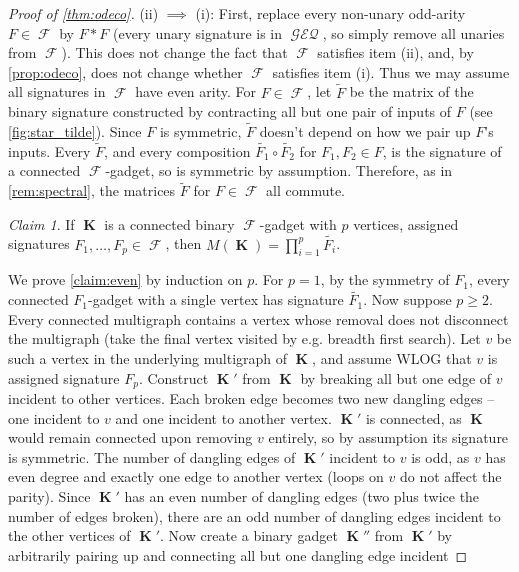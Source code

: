 \documentclass{article}
\theoremstyle{remark}
\newtheorem{claim}{Claim}[section]
\theoremstyle{definition}
\DeclareMathOperator{\vk}{\mathbf{K}}
\DeclareMathOperator{\fc}{\mathcal{F}}
\DeclareMathOperator{\geneq}{\mathcal{GEQ}}
\begin{document}
\begin{proof}[Proof of \autoref{thm:odeco}]
    (ii) $\implies$ (i): First, replace every non-unary odd-arity $F \in \fc$ by $F * F$
    (every unary signature is in $\geneq$, so simply remove all unaries from $\fc$). 
    This does not change
    the fact that $\fc$ satisfies item (ii), and, by \autoref{prop:odeco}, does not change whether
    $\fc$ satisfies item (i). Thus we may assume all signatures in $\fc$ have even arity. 
    For $F \in \fc$, let $\widetilde{F}$ be the 
    matrix of the binary signature constructed by contracting all but one pair of inputs of $F$ (see
    \autoref{fig:star_tilde}).
    Since $F$ is symmetric, $\widetilde{F}$ doesn't depend on how we pair up $F$'s inputs. 
    Every $\widetilde{F}$, and every composition $\widetilde{F_1} \circ \widetilde{F_2}$ for
    $F_1,F_2 \in F$, is the signature of a connected $\fc$-gadget, so is symmetric by assumption. 
    Therefore, as in \autoref{rem:spectral}, the matrices $\widetilde{F}$ for $F \in \fc$ all commute.
    \begin{claim}
        \label{claim:even}
        If $\vk$ is a connected binary $\fc$-gadget with $p$ vertices, assigned signatures 
        $F_1,\ldots,F_p \in \fc$, then $M(\vk) = \prod_{i=1}^p \widetilde{F_i}$.
    \end{claim}
    We prove \autoref{claim:even} by induction on $p$. For $p=1$, by the symmetry of $F_1$,
    every connected $F_1$-gadget with a single vertex has signature $\widetilde{F_1}$. 
    Now suppose $p \geq 2$. Every connected multigraph contains a vertex whose removal does not disconnect
    the multigraph (take the final vertex visited by e.g. breadth first search). Let $v$ be such
    a vertex in the underlying multigraph of $\vk$, and assume WLOG that $v$ is assigned
    signature $F_p$. Construct $\vk'$ from $\vk$ by breaking 
    all but one edge of $v$ incident to other vertices. Each broken edge becomes two new dangling 
    edges -- one incident to $v$ and one incident to another vertex.
    $\vk'$ is connected, as $\vk$ would remain connected upon removing $v$ entirely,
    so by assumption its signature is symmetric. 
    The number of dangling edges of $\vk'$ incident to $v$ is odd,
    as $v$ has even degree and exactly one edge to another vertex (loops on
    $v$ do not affect the parity). Since $\vk'$ has an
    even number of dangling edges (two plus twice the number of edges broken), there are an odd
    number of dangling edges incident to the other vertices of $\vk'$. Now create a binary gadget
    $\vk''$ from $\vk'$ by arbitrarily pairing up and connecting all but one dangling edge incident

\end{proof}
\end{document}
